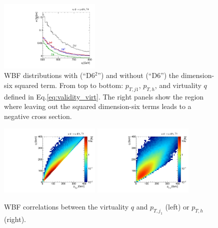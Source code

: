 \begin{figure}
  \hspace*{0.05\textwidth}
  \includegraphics[width=0.43\textwidth]{fig/validity/WBF_T4_q.pdf}
  \caption{WBF distributions with (``D6$^{2}$'') and without (``D6'') the
    dimension-six squared term. From top to bottom: $p_{T,j1}$, $p_{T,h}$, and
    virtuality $q$ defined in Eq.\;\eqref{eq:validity_virt}. The right panels show the region where
    leaving out the squared dimension-six terms leads to a negative cross
    section.}
  \label{fig:validity_squared_WBF}
\end{figure}


\begin{figure}[t]
  \includegraphics[width=0.43\textwidth]{fig/validity/WBF_correl_q_j1pt.pdf}
  \hspace*{0.05\textwidth}
  \includegraphics[width=0.43\textwidth]{fig/validity/WBF_correl_q_Hpt.pdf} 
  \caption{WBF correlations between the virtuality $q$ and
    $p_{T,j_1}$ (left) or $p_{T,h}$ (right).}
  \label{fig:validity_virt_corr}
\end{figure}

